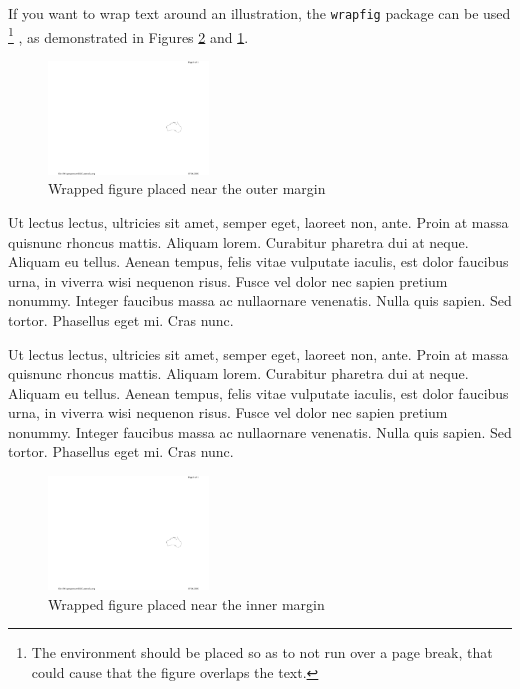 If you want to wrap text around an illustration, the \texttt{wrapfig} package can be used
\footnote{The environment should be placed so as to not run over a page break, that could cause that the figure overlaps the text.}
, as demonstrated in Figures \ref{fig:wrap-inner} and \ref{fig:wrap-outer}.

\begin{figure}
  \centering 
  \includegraphics[width=0.38\textwidth]{Graphics/introaustralia}
  \caption{Wrapped figure placed near the outer margin}
  \label{fig:wrap-outer}
\end{figure}

Ut lectus lectus, ultricies sit amet, semper eget, laoreet non, ante. Proin at massa quisnunc rhoncus mattis. Aliquam lorem. Curabitur pharetra dui at neque. Aliquam eu tellus. Aenean tempus, felis vitae vulputate iaculis, est dolor faucibus urna, in viverra wisi nequenon risus. Fusce vel dolor nec sapien pretium nonummy. Integer faucibus massa ac nullaornare venenatis. Nulla quis sapien. Sed tortor. Phasellus eget mi. Cras nunc.

Ut lectus lectus, ultricies sit amet, semper eget, laoreet non, ante. Proin at massa quisnunc rhoncus mattis. Aliquam lorem. Curabitur pharetra dui at neque. Aliquam eu tellus. Aenean tempus, felis vitae vulputate iaculis, est dolor faucibus urna, in viverra wisi nequenon risus. Fusce vel dolor nec sapien pretium nonummy. Integer faucibus massa ac nullaornare venenatis. Nulla quis sapien. Sed tortor. Phasellus eget mi. Cras nunc.

\begin{figure}
  \centering 
  \includegraphics[width=0.38\textwidth]{Graphics/introaustralia}
  \caption{Wrapped figure placed near the inner margin}
  \label{fig:wrap-inner}
\end{figure}

